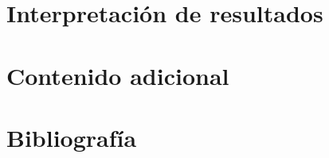 \documentclass[a4paper, 20pt]{article}
\begin{document}
\section{Interpretación de resultados}

\section{Contenido adicional}
\section{Bibliografía}
\end{document}
